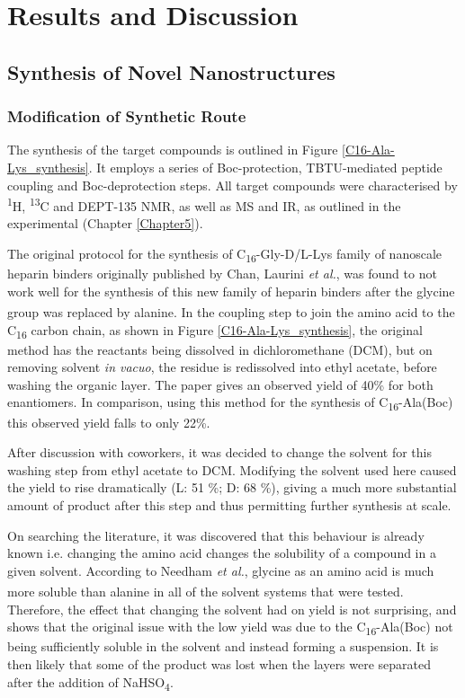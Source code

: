 \chapter{Results and Discussion} 
\label{Chapter2} 
\section{Synthesis of Novel Nanostructures}
\subsection{Modification of Synthetic Route}
The synthesis of the target compounds is outlined in Figure \ref{C16-Ala-Lys_synthesis}. It employs a series of Boc-protection, TBTU-mediated peptide coupling and Boc-deprotection steps. All target compounds were characterised by \textsuperscript{1}H, \textsuperscript{13}C and DEPT-135 NMR, as well as MS and IR, as outlined in the experimental (Chapter \ref{Chapter5}).

The original protocol for the synthesis of C\textsubscript{16}-Gly-D/L-Lys family of nanoscale heparin binders originally published by Chan, Laurini \textit{et al.}, was found to not work well for the synthesis of this new family of heparin binders after the glycine group was replaced by alanine.\textsuperscript{\cite{Chan2016ChiralBinding}} In the coupling step to join the amino acid to the C\textsubscript{16} carbon chain, as shown in Figure \ref{C16-Ala-Lys_synthesis}, the original method has the reactants being dissolved in dichloromethane (DCM), but on removing solvent \textit{in vacuo}, the residue is redissolved into ethyl acetate, before washing the organic layer.  The paper gives an observed yield of 40\% for both enantiomers. In comparison, using this method for the synthesis of C\textsubscript{16}-Ala(Boc) this observed yield falls to only 22\%. 

After discussion with coworkers, it was decided to change the solvent for this washing step from ethyl acetate to DCM. Modifying the solvent used here caused the yield to rise dramatically (L: 51 \%; D: 68 \%), giving a much more substantial amount of product after this step and thus permitting further synthesis at scale. 

On searching the literature, it was discovered that this behaviour is already known i.e. changing the amino acid changes the solubility of a compound in a given solvent. According to Needham \textit{et al.}, glycine as an amino acid is much more soluble than alanine in all of the solvent systems that were tested.\textsuperscript{\cite{Needham1971SolubilitySystems}}
Therefore, the effect that changing the solvent had on yield is not surprising, and shows that the original issue with the low yield was due to the C\textsubscript{16}-Ala(Boc) not being sufficiently soluble in the solvent and instead forming a suspension.  It is then likely that some of the product was lost when the layers were separated after the addition of NaHSO\textsubscript{4}. 

